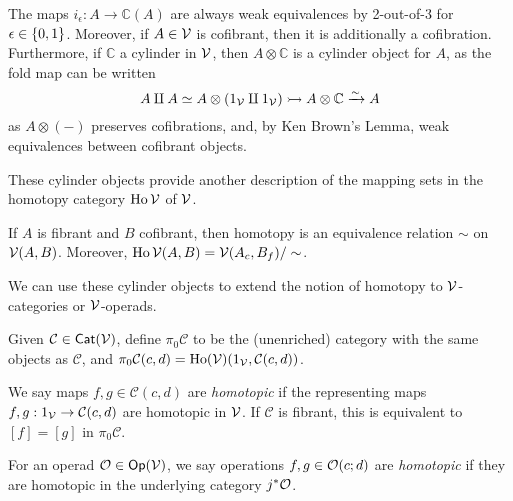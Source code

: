 \documentclass[a4paper,10pt
,draft
]{article}%
\renewcommand{\1}{\eta}%
\begin{document}
\begin{remark}
      \label{CYL_REM}
      The maps $i_\epsilon: A \to \mathbb C(A)$ are always weak equivalences by 2-out-of-3 for $\epsilon \in \left\{0,1\right\}$.
      Moreover, if $A \in \mathcal V$ is cofibrant, then it is additionally a cofibration.
      Furthermore, if $\mathbb C$ a cylinder in $\mathcal V$,
      then $A \otimes \mathbb C$ is a cylinder object for $A$,
      as the fold map can be written
      \begin{equation}
            A \amalg A \simeq A \otimes (1_{\mathcal V} \amalg 1_{\mathcal V}) \rightarrowtail A \otimes \mathbb C \xrightarrow{\sim} A
      \end{equation}
      as $A \otimes (-)$ preserves cofibrations, and, by Ken Brown's Lemma, weak equivalences between cofibrant objects.
\end{remark}

These cylinder objects provide another description of the mapping sets in the homotopy category $\operatorname{Ho} \mathcal V$ of $\mathcal V$.

\begin{proposition}       
      If $A$ is fibrant and $B$ cofibrant, then
      homotopy is an equivalence relation $\sim$ on $\mathcal V(A,B)$.
      Moreover, 
      $\operatorname{Ho} \mathcal V (A,B) = \mathcal V(A_c, B_f)/\sim$.
\end{proposition}

We can use these cylinder objects to extend the notion of homotopy to $\mathcal V$-categories or $\mathcal V$-operads.

\begin{definition}
      \label{HTPY_DEFN}
      Given $\mathcal C \in \mathsf{Cat}(\mathcal V)$, define $\pi_0 \mathcal C$ to be the (unenriched) category with
      the same objects as $\mathcal C$, and $\pi_0 \mathcal C (c,d) = \operatorname{Ho}(\mathcal V)(1_{\mathcal V}, \mathcal C(c,d))$.

      We say maps $f,g \in \mathcal C(c,d)$ are \textit{homotopic}
      if the representing maps $f,g: 1_{\mathcal V} \to \mathcal C(c,d)$ are homotopic in $\mathcal V$.
      If $\mathcal C$ is fibrant, this is equivalent to $[f] = [g]$ in $\pi_0\mathcal C$.

      For an operad $\mathcal{O} \in \mathsf{Op}(\mathcal V)$, we say operations $f,g \in \mathcal{O}(c;d)$ are \textit{homotopic} if they are homotopic in the underlying category $j^{\**}\O$. 
\end{definition}







\end{document}
